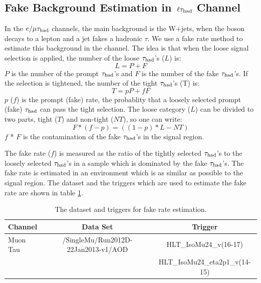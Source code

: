 \subsection{\texorpdfstring{Fake Background Estimation in $\,\ell\tau_{\rm had}$ Channel}{Fake Background Estimation in lepton-tau Channel}}
\label{sect:bkgLeptau}
In the $e/\mu\tau_{\rm had}$ channels, the main background is the W+jets, when the \Wpm boson decays to a lepton and a jet fakes a hadronic $\tau$.
We use a fake rate method to estimate this background \cite{CMS_AN_2010-261} in the \muTau channel.
The idea is that when the loose signal selection is applied, the number of the loose $\tau_{\rm had}$'s ($L$) is:
\begin{equation}
L = P + F
\end{equation}
$P$ is the number of the  prompt $\tau_{\rm had}$'s and $F$ is the number of the  fake $\tau_{\rm had}$'s. If the selection is tightened, the number of the tight $\tau_{\rm had}$'s (T) is:
\begin{equation}
 T = pP + fF
\end{equation} 
$p$ ($f$) is the prompt (fake) rate, the probablity that a loosely selected prompt (fake) $\tau_{\rm had}$ can pass the  tight  selection. The loose category ($L$) can be divided to two parts, 
tight ($T$) and non-tight ($NT$), so one can write:
\begin{equation}
   F * (f - p) = ((1 - p) * L - NT)
\end{equation}
$f$ * $F$ is the contamination of the fake $\tau_{\rm had}$'s in the signal region. 

The fake rate ($f$) is measured as the ratio of the tightly selected $\tau_{\rm had}$'s to the loosely 
selected $\tau_{\rm had}$'s in a sample which is dominated by the fake $\tau_{\rm had}$'s. The fake rate is estimated in an environment which is as similar as possible to 
the signal region. The dataset and the triggers which are used to estimate the fake rate %
are shown in table \ref{Tab.DataFR}.
\begin{table}[!htb]
\begin{center}
\begin{tabular}{|l|c|c|}
\hline
Channel      & Data Set                                     & Trigger \\\hline
Muon Tau     & /SingleMu/Run2012D-22Jan2013-v1/AOD          & HLT\_IsoMu24\_v(16-17)\\
             &                                              & HLT\_IsoMu24\_eta2p1\_v(14-15)\\\hline
\hline
\end{tabular}
\caption{The dataset and triggers for fake rate estimation.}
\label{Tab.DataFR}
\end{center}
\end{table}

